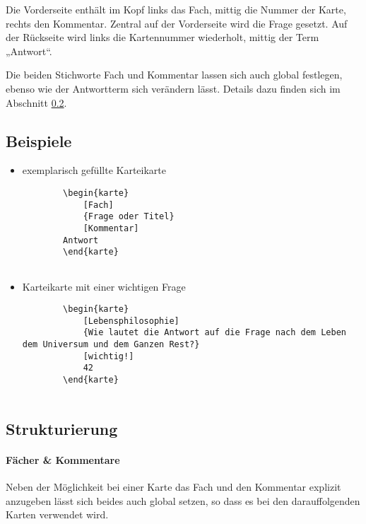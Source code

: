 \documentclass[a4paper]{article}
\begin{document}
Die Vorderseite enthält im Kopf links das Fach, mittig die Nummer der Karte, rechts den Kommentar. Zentral auf der Vorderseite wird die Frage gesetzt. Auf der Rückseite wird links die Kartennummer wiederholt, mittig der Term „Antwort“.

Die beiden Stichworte Fach und Kommentar lassen sich auch global festlegen, ebenso wie der Antwortterm sich verändern lässt. Details dazu finden sich im Abschnitt \ref{subsec:Struktur}.

\newpage

\subsection{Beispiele}
\begin{itemize}
	\item exemplarisch gefüllte Karteikarte
	\begin{lstlisting}
		\begin{karte}
			[Fach]
			{Frage oder Titel}
			[Kommentar]
		Antwort
		\end{karte}
		
	\end{lstlisting} 
	\item Karteikarte mit einer wichtigen Frage
	\begin{lstlisting}
		\begin{karte}
			[Lebensphilosophie]
			{Wie lautet die Antwort auf die Frage nach dem Leben dem Universum und dem Ganzen Rest?}
			[wichtig!]
			42
		\end{karte}
		
	\end{lstlisting}
\end{itemize}

\subsection{Strukturierung}\label{subsec:Struktur}
\paragraph{Fächer \& Kommentare}
Neben der Möglichkeit bei einer Karte das Fach und den Kommentar explizit anzugeben lässt sich beides auch global setzen, so dass es bei den darauffolgenden Karten verwendet wird.
\end{document}
